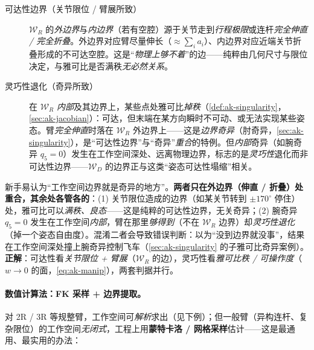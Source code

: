 \begin{description}
  \item[可达性边界（关节限位 / 臂展所致）] $\mathcal{W}_R$ 的\emph{外边界}与\emph{内边界}（若有空腔）源于关节走到\emph{行程极限}或连杆\emph{完全伸直 / 完全折叠}。外边界对应臂尽量伸长（$\approx\sum_i a_i$）、内边界对应近端关节折叠形成的不可达空腔。这是“\emph{物理上够不着}”的边——纯粹由几何尺寸与限位决定，与雅可比是否满秩\emph{无必然关系}。
  \item[灵巧性退化（奇异所致）] 在 $\mathcal{W}_R$ \emph{内部}及其边界上，某些点处雅可比\emph{掉秩}（\cref{def:ak-singularity}，\cref{sec:ak-jacobian}）：可达，但末端在某方向瞬时不可动、或无法实现某些姿态。臂\emph{完全伸直}时落在 $\mathcal{W}_R$ 外边界上——这是\emph{边界奇异}（肘奇异，\cref{sec:ak-singularity}），是“可达性边界”与“奇异”\emph{重合}的特例。但\emph{内部}奇异（如腕奇异 $q_5=0$）发生在工作空间深处、远离物理边界，标志的是\emph{灵巧性}退化而非可达性边界——$\mathcal{W}_D$ 的边界正与这类“姿态可达性塌缩”相关。
\end{description}

\begin{pitfall}
新手易认为“工作空间边界就是奇异的地方”。\textbf{两者只在外边界（伸直 / 折叠）处重合，其余处各管各的}：(1) 关节限位造成的边界（如某关节转到 $\pm170^\circ$ 停住）处，雅可比可以\emph{满秩、良态}——这是纯粹的可达性边界，无关奇异；(2) 腕奇异 $q_5=0$ 发生在工作空间\emph{内部}，臂在那里\emph{够得到}（不在 $\mathcal{W}_R$ 边界）却\emph{灵巧性退化}（掉一个姿态自由度）。混淆二者会导致错误判断：以为“没到边界就没事”，结果在工作空间深处撞上腕奇异控制飞车（\cref{sec:ak-singularity} 的子雅可比奇异案例）。\textbf{正解}：可达性看\emph{关节限位 + 臂展}（$\mathcal{W}_R$ 的边），灵巧性看\emph{雅可比秩 / 可操作度}（$w\to0$ 的面，\cref{eq:ak-manip}），两套判据并行。
\end{pitfall}

\paragraph{数值计算法：FK 采样 + 边界提取。}
对 2R / 3R 等规整臂，工作空间可\emph{解析}求出（见下例）；但一般臂（异构连杆、复杂限位）的工作空间\emph{无闭式}，工程上用\textbf{蒙特卡洛 / 网格采样}估计——这是最通用、最实用的办法：

